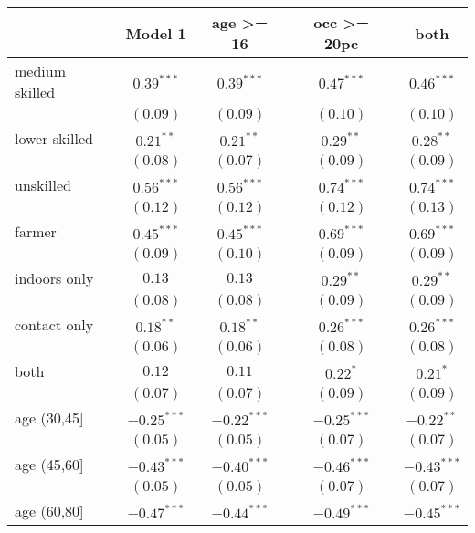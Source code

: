 
\begin{table}[h!]
\begin{center}
\begin{small}
\begin{tabular}{l c c c c}
\hline
 & Model 1 & age >= 16 & occ >= 20pc & both \\
\hline
medium skilled & $0.39^{***}$  & $0.39^{***}$  & $0.47^{***}$  & $0.46^{***}$  \\
               & $(0.09)$      & $(0.09)$      & $(0.10)$      & $(0.10)$      \\
lower skilled  & $0.21^{**}$   & $0.21^{**}$   & $0.29^{**}$   & $0.28^{**}$   \\
               & $(0.08)$      & $(0.07)$      & $(0.09)$      & $(0.09)$      \\
unskilled      & $0.56^{***}$  & $0.56^{***}$  & $0.74^{***}$  & $0.74^{***}$  \\
               & $(0.12)$      & $(0.12)$      & $(0.12)$      & $(0.13)$      \\
farmer         & $0.45^{***}$  & $0.45^{***}$  & $0.69^{***}$  & $0.69^{***}$  \\
               & $(0.09)$      & $(0.10)$      & $(0.09)$      & $(0.09)$      \\
indoors only   & $0.13$        & $0.13$        & $0.29^{**}$   & $0.29^{**}$   \\
               & $(0.08)$      & $(0.08)$      & $(0.09)$      & $(0.09)$      \\
contact only   & $0.18^{**}$   & $0.18^{**}$   & $0.26^{***}$  & $0.26^{***}$  \\
               & $(0.06)$      & $(0.06)$      & $(0.08)$      & $(0.08)$      \\
both           & $0.12$        & $0.11$        & $0.22^{*}$    & $0.21^{*}$    \\
               & $(0.07)$      & $(0.07)$      & $(0.09)$      & $(0.09)$      \\
age (30,45]    & $-0.25^{***}$ & $-0.22^{***}$ & $-0.25^{***}$ & $-0.22^{**}$  \\
               & $(0.05)$      & $(0.05)$      & $(0.07)$      & $(0.07)$      \\
age (45,60]    & $-0.43^{***}$ & $-0.40^{***}$ & $-0.46^{***}$ & $-0.43^{***}$ \\
               & $(0.05)$      & $(0.05)$      & $(0.07)$      & $(0.07)$      \\
age (60,80]    & $-0.47^{***}$ & $-0.44^{***}$ & $-0.49^{***}$ & $-0.45^{***}$ \\

\end{tabular}
\end{small}
\end{center}
\end{table}

